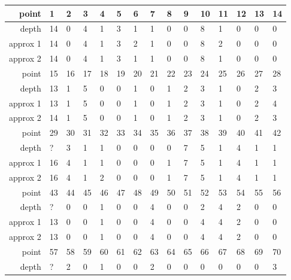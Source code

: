 \begin{center}
  \tablefirsthead{\hline}
  \tablelasttail{\hline}
  \begin{supertabular}{|r|l l l l l l l l l l l l l l|}
\hline
point & 1 & 2 & 3 & 4 & 5 & 6 & 7 & 8 & 9 & 10 & 11 & 12 & 13 & 14 \\
\hline
depth & 14 & 0 & 4 & 1 & 3 & 1 & 1 & 0 & 0 & 8 & 1 & 0 & 0 & 0 \\
approx 1 & 14 & 0 & 4 & 1 & 3 & 2 & 1 & 0 & 0 & 8 & 2 & 0 & 0 & 0 \\
approx 2 & 14 & 0 & 4 & 1 & 3 & 1 & 1 & 0 & 0 & 8 & 1 & 0 & 0 & 0 \\
\hline
point & 15 & 16 & 17 & 18 & 19 & 20 & 21 & 22 & 23 & 24 & 25 & 26 & 27 & 28 \\
\hline
depth & 13 & 1 & 5 & 0 & 0 & 1 & 0 & 1 & 2 & 3 & 1 & 0 & 2 & 3 \\
approx 1 & 13 & 1 & 5 & 0 & 0 & 1 & 0 & 1 & 2 & 3 & 1 & 0 & 2 & 4 \\
approx 2 & 14 & 1 & 5 & 0 & 0 & 1 & 0 & 1 & 2 & 3 & 1 & 0 & 2 & 3 \\
\hline
point & 29 & 30 & 31 & 32 & 33 & 34 & 35 & 36 & 37 & 38 & 39 & 40 & 41 & 42 \\
\hline
depth & ? & 3 & 1 & 1 & 0 & 0 & 0 & 0 & 7 & 5 & 1 & 4 & 1 & 1 \\
approx 1 & 16 & 4 & 1 & 1 & 0 & 0 & 0 & 1 & 7 & 5 & 1 & 4 & 1 & 1 \\
approx 2 & 16 & 4 & 1 & 2 & 0 & 0 & 0 & 1 & 7 & 5 & 1 & 4 & 1 & 1 \\
\hline
point & 43 & 44 & 45 & 46 & 47 & 48 & 49 & 50 & 51 & 52 & 53 & 54 & 55 & 56 \\
\hline
depth & ? & 0 & 0 & 1 & 0 & 0 & 4 & 0 & 0 & 2 & 4 & 2 & 0 & 0 \\
approx 1 & 13 & 0 & 0 & 1 & 0 & 0 & 4 & 0 & 0 & 4 & 4 & 2 & 0 & 0 \\
approx 2 & 13 & 0 & 0 & 1 & 0 & 0 & 4 & 0 & 0 & 4 & 4 & 2 & 0 & 0 \\
\hline
point & 57 & 58 & 59 & 60 & 61 & 62 & 63 & 64 & 65 & 66 & 67 & 68 & 69 & 70 \\
\hline
depth & ? & 2 & 0 & 1 & 0 & 0 & 2 & 0 & 0 & 0 & 0 & 0 & 0 & 3 \\

\end{supertabular}
\end{center}
